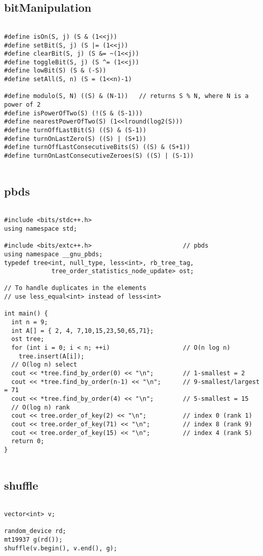\documentclass[landscape,twocolumn,10pt,a4paper]{article}
\begin{document}
\subsection{bitManipulation}
\begin{verbatim}

#define isOn(S, j) (S & (1<<j))
#define setBit(S, j) (S |= (1<<j))
#define clearBit(S, j) (S &= ~(1<<j))
#define toggleBit(S, j) (S ^= (1<<j))
#define lowBit(S) (S & (-S))
#define setAll(S, n) (S = (1<<n)-1)

#define modulo(S, N) ((S) & (N-1))   // returns S % N, where N is a power of 2
#define isPowerOfTwo(S) (!(S & (S-1)))
#define nearestPowerOfTwo(S) (1<<lround(log2(S)))
#define turnOffLastBit(S) ((S) & (S-1))
#define turnOnLastZero(S) ((S) | (S+1))
#define turnOffLastConsecutiveBits(S) ((S) & (S+1))
#define turnOnLastConsecutiveZeroes(S) ((S) | (S-1))


\end{verbatim}

\subsection{pbds}
\begin{verbatim}

#include <bits/stdc++.h>
using namespace std;

#include <bits/extc++.h>                         // pbds
using namespace __gnu_pbds;
typedef tree<int, null_type, less<int>, rb_tree_tag,
             tree_order_statistics_node_update> ost;

// To handle duplicates in the elements
// use less_equal<int> instead of less<int>

int main() {
  int n = 9;
  int A[] = { 2, 4, 7,10,15,23,50,65,71};
  ost tree;
  for (int i = 0; i < n; ++i)                    // O(n log n)
    tree.insert(A[i]);
  // O(log n) select
  cout << *tree.find_by_order(0) << "\n";        // 1-smallest = 2
  cout << *tree.find_by_order(n-1) << "\n";      // 9-smallest/largest = 71
  cout << *tree.find_by_order(4) << "\n";        // 5-smallest = 15
  // O(log n) rank
  cout << tree.order_of_key(2) << "\n";          // index 0 (rank 1)
  cout << tree.order_of_key(71) << "\n";         // index 8 (rank 9)
  cout << tree.order_of_key(15) << "\n";         // index 4 (rank 5)
  return 0;
}


\end{verbatim}

\subsection{shuffle}
\begin{verbatim}

vector<int> v;

random_device rd;
mt19937 g(rd());
shuffle(v.begin(), v.end(), g);

\end{verbatim}
\end{document}
